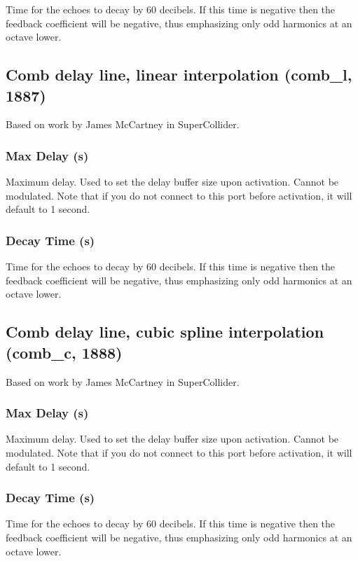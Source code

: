 \documentclass[11pt]{article}
\begin{document}
       Time for the echoes to decay by 60 decibels. If this time is negative
       then the feedback coefficient will be negative, thus emphasizing only odd
       harmonics at an octave lower.
      \subsection{Comb delay line, linear interpolation (comb\_l, 1887)\label{comb_l}\label{id1887}}
Based on work by James McCartney in SuperCollider.\subsubsection*{Max Delay (s)}

       Maximum delay. Used to set the delay buffer size upon activation. Cannot
       be modulated. Note that if you do not connect to this port before
       activation, it will default to 1 second. 
      \subsubsection*{Decay Time (s)}

       Time for the echoes to decay by 60 decibels. If this time is negative
       then the feedback coefficient will be negative, thus emphasizing only odd
       harmonics at an octave lower.
      \subsection{Comb delay line, cubic spline interpolation (comb\_c, 1888)\label{comb_c}\label{id1888}}
Based on work by James McCartney in SuperCollider.\subsubsection*{Max Delay (s)}

       Maximum delay. Used to set the delay buffer size upon activation. Cannot
       be modulated. Note that if you do not connect to this port before
       activation, it will default to 1 second. 
      \subsubsection*{Decay Time (s)}

       Time for the echoes to decay by 60 decibels. If this time is negative
       then the feedback coefficient will be negative, thus emphasizing only odd
       harmonics at an octave lower.
\end{document}

